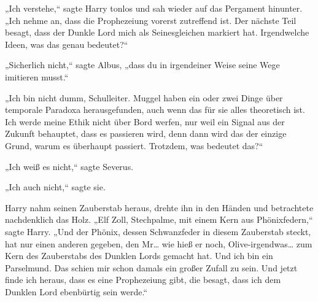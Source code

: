 „Ich verstehe,“ sagte Harry tonlos und sah wieder auf das Pergament hinunter. „Ich nehme an, dass die Prophezeiung vorerst zutreffend ist. Der nächste Teil besagt, dass der Dunkle Lord mich als Seinesgleichen markiert hat. Irgendwelche Ideen, was das genau bedeutet?“

„Sicherlich nicht,“ sagte Albus, „dass du in irgendeiner Weise seine Wege imitieren musst.“

„Ich bin nicht dumm, Schulleiter. Muggel haben ein oder zwei Dinge über temporale Paradoxa herausgefunden, auch wenn das für sie alles theoretisch ist. Ich werde meine Ethik nicht über Bord werfen, nur weil ein Signal aus der Zukunft behauptet, dass es passieren wird, denn dann wird das der einzige Grund, warum es überhaupt passiert. Trotzdem, was bedeutet das?“

„Ich weiß es nicht,“ sagte Severus.

„Ich auch nicht,“ sagte sie.

Harry nahm seinen Zauberstab heraus, drehte ihn in den Händen und betrachtete nachdenklich das Holz. „Elf Zoll, Stechpalme, mit einem Kern aus Phönixfedern,“ sagte Harry. „Und der Phönix, dessen Schwanzfeder in diesem Zauberstab steckt, hat nur einen anderen gegeben, den Mr… wie hieß er noch, Olive-irgendwas… zum Kern des Zauberstabs des Dunklen Lords gemacht hat. Und ich bin ein Parselmund. Das schien mir schon damals ein großer Zufall zu sein. Und jetzt finde ich heraus, dass es eine Prophezeiung gibt, die besagt, dass ich dem Dunklen Lord ebenbürtig sein werde.“

